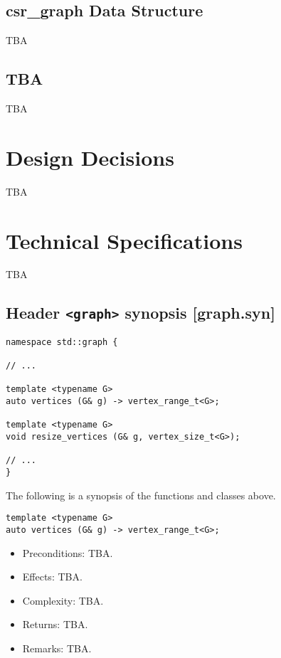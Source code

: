 \documentclass[10pt,onecolumn]{article}
\begin{document}
\subsection{csr\_graph Data Structure}
TBA

\subsection{TBA}
TBA

\section{Design Decisions}
TBA

\section{Technical Specifications}
TBA

\subsection{Header \texttt{<graph>} synopsis [graph.syn]}

\begin{lstlisting}
namespace std::graph {

// ...

template <typename G>
auto vertices (G& g) -> vertex_range_t<G>;

template <typename G>
void resize_vertices (G& g, vertex_size_t<G>);

// ...
}
\end{lstlisting}

\vspace{10pt}

\noindent The following is a synopsis of the functions and classes above.

\begin{lstlisting}
template <typename G>
auto vertices (G& g) -> vertex_range_t<G>;
\end{lstlisting}
%
\begin{itemize}
\item Preconditions: TBA.
\item Effects: TBA.
\item Complexity: TBA.
\item Returns: TBA.
\item Remarks: TBA.
\end{itemize}

\vspace{10pt}
\end{document}
